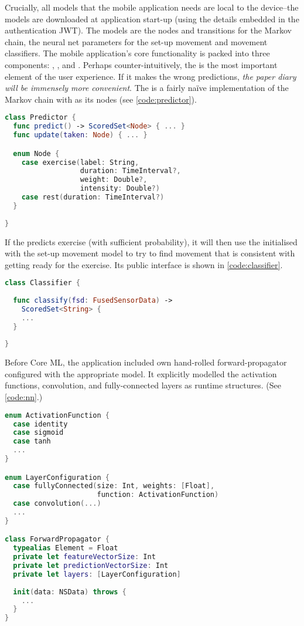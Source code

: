 Crucially, all models that the mobile application needs are local to the device--the models are downloaded at application start-up (using the details embedded in the authentication JWT). The models are the nodes and transitions for the Markov chain, the neural net parameters for the set-up movement and movement classifiers. The mobile application's core functionality is packed into three components: , , and . Perhaps counter-intuitively, the  is the most important element of the user experience. If it makes the wrong predictions, \emph{the paper diary will be immensely more convenient}. The  is a fairly naïve implementation of the Markov chain with  as its nodes (see \autoref{code:predictor}).

\begin{lstlisting}[caption={Predictor}, label={code:predictor}, language=swift, escapechar=|]
class Predictor {
  func predict() -> ScoredSet<Node> { ... }
  func update(taken: Node) { ... }

  enum Node {
    case exercise(label: String, 
                  duration: TimeInterval?, 
                  weight: Double?, 
                  intensity: Double?)
    case rest(duration: TimeInterval?)
  }
    
}
\end{lstlisting}

If the  predicts exercise (with sufficient probability), it will then use the  initialised with the set-up movement model to try to find movement that is consistent with getting ready for the exercise. Its public interface is shown in \autoref{code:classifier}.

\begin{lstlisting}[caption={Classifier}, label={code:classifier}, language=swift, escapechar=|]
class Classifier {
  
  func classify(fsd: FusedSensorData) -> 
    ScoredSet<String> {
    ...
  }
    
}
\end{lstlisting}

Before Core ML\cite{coreml}, the application included own hand-rolled forward-propagator configured with the appropriate model. It explicitly modelled the activation functions, convolution, and fully-connected layers as runtime structures. (See \autoref{code:nn}.)

\begin{lstlisting}[caption={Runtime structures for NN}, label={code:nn}, language=swift, escapechar=|]
enum ActivationFunction {
  case identity
  case sigmoid
  case tanh
  ...
}

enum LayerConfiguration {
  case fullyConnected(size: Int, weights: [Float], 
                      function: ActivationFunction)
  case convolution(...)
  ...
}

class ForwardPropagator {
  typealias Element = Float
  private let featureVectorSize: Int
  private let predictionVectorSize: Int
  private let layers: [LayerConfiguration]
  
  init(data: NSData) throws {
    ...
  }
}
\end{lstlisting}

